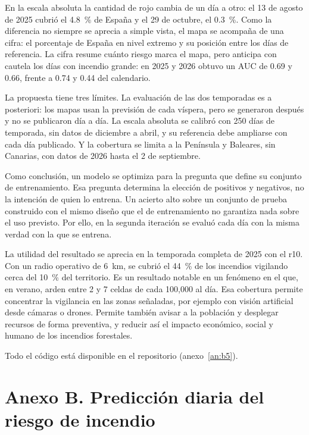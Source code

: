 \documentclass[10pt,a4paper]{article}
\renewcommand{\thesubsection}{3.\arabic{subsection}}
\begin{document}
En la escala absoluta la cantidad de rojo cambia de un día a otro: el 13 de
agosto de 2025 cubrió el 4.8~\% de España y el 29 de octubre, el 0.3~\%. Como
la diferencia no siempre se aprecia a simple vista, el mapa se acompaña de una
cifra: el porcentaje de España en nivel extremo y su posición entre los días de
referencia. La cifra resume cuánto riesgo marca el mapa, pero anticipa con
cautela los días con incendio grande: en 2025 y 2026 obtuvo un AUC de 0.69 y
0.66, frente a 0.74 y 0.44 del calendario.

\FloatBarrier
La propuesta tiene tres límites. La evaluación de las dos temporadas es a
posteriori: los mapas usan la previsión de cada víspera, pero se generaron
después y no se publicaron día a día. La escala absoluta se calibró con 250
días de temporada, sin datos de diciembre a abril, y su referencia debe
ampliarse con cada día publicado. Y la cobertura se limita a la Península y
Baleares, sin Canarias, con datos de 2026 hasta el 2 de septiembre.

Como conclusión, un modelo se optimiza para la pregunta que define su conjunto
de entrenamiento. Esa pregunta determina la elección de positivos y negativos,
no la intención de quien lo entrena. Un acierto alto sobre un conjunto de
prueba construido con el mismo diseño que el de entrenamiento no garantiza nada
sobre el uso previsto. Por ello, en la segunda iteración se evaluó cada día con
la misma verdad con la que se entrena.

La utilidad del resultado se aprecia en la temporada completa de 2025 con el
r10. Con un radio operativo de 6~km, se cubrió el 44~\% de los incendios
vigilando cerca del 10~\% del territorio. Es un resultado notable en un
fenómeno en el que, en verano, arden entre 2 y 7 celdas de cada 100,000 al día.
Esa cobertura permite concentrar la vigilancia en las zonas señaladas, por
ejemplo con visión artificial desde cámaras o drones. Permite también avisar a
la población y desplegar recursos de forma preventiva, y reducir así el
impacto económico, social y humano de los incendios forestales.

Todo el código está disponible en el repositorio (anexo~\ref{an:b5}).


\clearpage
\section*{Anexo B. Predicción diaria del riesgo de incendio}
\setcounter{subsection}{0}
\setcounter{secnumdepth}{3}
\renewcommand{\thesubsection}{B.\arabic{subsection}}
\renewcommand{\thesubsubsection}{B.\arabic{subsection}.\arabic{subsubsection}}
\renewcommand{\theHsubsection}{anexoB.\arabic{subsection}}
\renewcommand{\theHsubsubsection}{anexoB.\arabic{subsection}.\arabic{subsubsection}}
\providecommand{\repo}[2]{\href{https://github.com/JuanUtrilla/tfm-riesgo-incendios/#1}{\texttt{#2}}}
\newcommand{\enrepo}[1]{\par\smallskip\noindent{\small\textit{En el repositorio:} #1.}\par}
\end{document}
